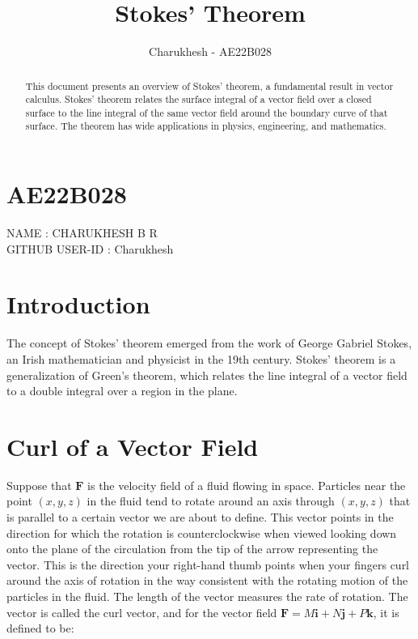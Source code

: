 \documentclass{article}
\title{Stokes' Theorem}
\author{Charukhesh - AE22B028}
\date{}
\begin{document}
\maketitle

\begin{abstract}
This document presents an overview of Stokes' theorem, a fundamental result in vector calculus. Stokes' theorem relates the surface integral of a vector field over a closed surface to the line integral of the same vector field around the boundary curve of that surface. The theorem has wide applications in physics, engineering, and mathematics.
\end{abstract}

\section{AE22B028}

NAME : CHARUKHESH B R \\
GITHUB USER-ID : Charukhesh

\section{Introduction}

The concept of Stokes' theorem emerged from the work of George Gabriel Stokes, an Irish mathematician and physicist in the 19th century. Stokes' theorem is a generalization of Green's theorem, which relates the line integral of a vector field to a double integral over a region in the plane.

\section{Curl of a Vector Field}

Suppose that $\mathbf{F}$ is the velocity field of a fluid flowing in space. Particles near the point $(x, y, z)$ in the fluid tend to rotate around an axis through $(x, y, z)$ that is parallel to a certain vector we are about to define. This vector points in the direction for which the rotation is counterclockwise when viewed looking down onto the plane of the circulation from the tip of the arrow representing the vector. This is the direction your right-hand thumb points when your fingers curl around the axis of rotation in the way consistent with the rotating motion of the particles in the fluid. The length of the vector measures the rate of rotation. The vector is called the curl vector, and for the vector field $\mathbf{F} = M\mathbf{i} + N\mathbf{j} + P\mathbf{k}$, it is defined to be:
\end{document}
